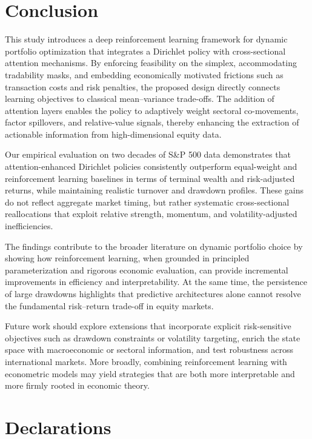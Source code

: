 \documentclass[10pt,leqno]{amsart}
\begin{document}
\section{Conclusion}
This study introduces a deep reinforcement learning framework for dynamic portfolio optimization that integrates a Dirichlet policy with cross-sectional attention mechanisms. By enforcing feasibility on the simplex, accommodating tradability masks, and embedding economically motivated frictions such as transaction costs and risk penalties, the proposed design directly connects learning objectives to classical mean–variance trade-offs. The addition of attention layers enables the policy to adaptively weight sectoral co-movements, factor spillovers, and relative-value signals, thereby enhancing the extraction of actionable information from high-dimensional equity data.

Our empirical evaluation on two decades of S\&P 500 data demonstrates that attention-enhanced Dirichlet policies consistently outperform equal-weight and reinforcement learning baselines in terms of terminal wealth and risk-adjusted returns, while maintaining realistic turnover and drawdown profiles. These gains do not reflect aggregate market timing, but rather systematic cross-sectional reallocations that exploit relative strength, momentum, and volatility-adjusted inefficiencies.

The findings contribute to the broader literature on dynamic portfolio choice by showing how reinforcement learning, when grounded in principled parameterization and rigorous economic evaluation, can provide incremental improvements in efficiency and interpretability. At the same time, the persistence of large drawdowns highlights that predictive architectures alone cannot resolve the fundamental risk–return trade-off in equity markets.

Future work should explore extensions that incorporate explicit risk-sensitive objectives such as drawdown constraints or volatility targeting, enrich the state space with macroeconomic or sectoral information, and test robustness across international markets. More broadly, combining reinforcement learning with econometric models may yield strategies that are both more interpretable and more firmly rooted in economic theory.








\section*{Declarations}
\end{document}
